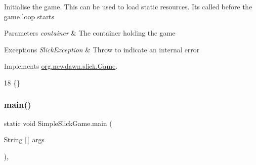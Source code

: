Initialise the game. This can be used to load static resources. It\textquotesingle{}s called before the game loop starts


\begin{DoxyParams}{Parameters}
{\em container} & The container holding the game \\
\hline
\end{DoxyParams}

\begin{DoxyExceptions}{Exceptions}
{\em Slick\+Exception} & Throw to indicate an internal error \\
\hline
\end{DoxyExceptions}


Implements \mbox{\hyperlink{interfaceorg_1_1newdawn_1_1slick_1_1_game_ad2dd6affab08bb8fdb5fab0815957b7a}{org.\+newdawn.\+slick.\+Game}}.


\begin{DoxyCode}
18 \{\}
\end{DoxyCode}
\mbox{\label{class_simple_slick_game_a8d7c9dfdb647da562993ab6deb8c562d}} 
\subsubsection{\texorpdfstring{main()}{main()}}
{\footnotesize\ttfamily static void Simple\+Slick\+Game.\+main (\begin{DoxyParamCaption}\item[{String \mbox{[}$\,$\mbox{]}}]{args }\end{DoxyParamCaption})\hspace{0.3cm}{\ttfamily [inline]}, {\ttfamily [static]}}


